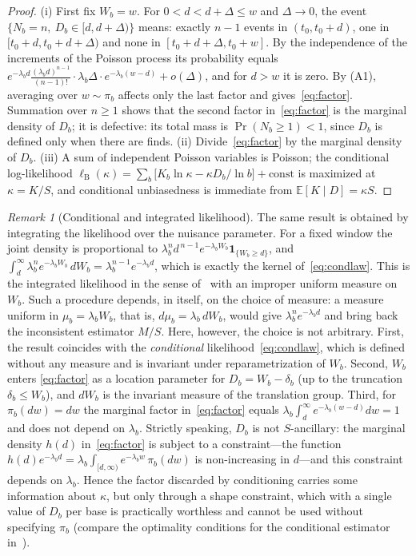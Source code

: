 \documentclass[11pt,a4paper]{article}
\theoremstyle{plain}
\theoremstyle{remark}
\newtheorem{remark}{Remark}
\begin{document}
\begin{proof}
(i) First fix $W_b=w$. For $0<d<d+\Delta\le w$ and $\Delta\to0$, the event
$\{N_b=n,\ D_b\in[d,d+\Delta)\}$ means: exactly $n-1$ events in $(t_0,t_0+d)$,
one in $[t_0+d,t_0+d+\Delta)$ and none in $[t_0+d+\Delta,t_0+w]$. By the
independence of the increments of the Poisson process its probability equals
$e^{-\lambda_bd}\frac{(\lambda_bd)^{n-1}}{(n-1)!}\cdot\lambda_b\Delta\cdot
e^{-\lambda_b(w-d)}+o(\Delta)$, and for $d>w$ it is zero. By (A1), averaging
over $w\sim\pi_b$ affects only the last factor and gives~\eqref{eq:factor}.
Summation over $n\ge1$ shows that the second factor in~\eqref{eq:factor} is the
marginal density of $D_b$; it is defective: its total mass is $\Pr(N_b\ge1)<1$,
since $D_b$ is defined only when there are finds.
(ii) Divide~\eqref{eq:factor} by the marginal density of $D_b$.
(iii) A sum of independent Poisson variables is Poisson; the conditional
log-likelihood $\ell_{\mathrm B}(\kappa)=\sum_b\bigl[K_b\ln\kappa-\kappa D_b/\ln b\bigr]
+\mathrm{const}$ is maximized at $\kappa=K/S$, and conditional unbiasedness is
immediate from $\mathbb E[K\mid D]=\kappa S$.
\end{proof}

\begin{remark}[Conditional and integrated likelihood]\label{rem:integrated}
The same result is obtained by integrating the likelihood over the nuisance
parameter. For a fixed window the joint density is proportional to
$\lambda_b^{n}d^{\,n-1}e^{-\lambda_bW_b}\mathbf 1_{\{W_b\ge d\}}$, and
$\int_d^\infty\lambda_b^{n}e^{-\lambda_bW_b}\,dW_b=\lambda_b^{n-1}e^{-\lambda_bd}$,
which is exactly the kernel of~\eqref{eq:condlaw}. This is the integrated
likelihood in the sense of~\cite{berger1999} with an improper uniform measure on
$W_b$. Such a procedure depends, in itself, on the choice of measure: a measure
uniform in $\mu_b=\lambda_bW_b$, that is, $d\mu_b=\lambda_b\,dW_b$, would give
$\lambda_b^{n}e^{-\lambda_bd}$ and bring back the inconsistent estimator $M/S$.
Here, however, the choice is not arbitrary. First, the result coincides with the
\emph{conditional} likelihood~\eqref{eq:condlaw}, which is defined without any
measure and is invariant under reparametrization of $W_b$. Second, $W_b$ enters
\eqref{eq:factor} as a location parameter for $D_b=W_b-\delta_b$ (up to the
truncation $\delta_b\le W_b$), and $dW_b$ is the invariant measure of the
translation group. Third, for $\pi_b(dw)=dw$ the
marginal factor in~\eqref{eq:factor} equals
$\lambda_b\int_d^\infty e^{-\lambda_b(w-d)}dw=1$ and does not depend on
$\lambda_b$. Strictly speaking, $D_b$ is not $S$-ancillary: the marginal
density $h(d)$ in~\eqref{eq:factor} is subject to a constraint---the function
$h(d)e^{-\lambda_bd}=\lambda_b\int_{[d,\infty)}e^{-\lambda_bw}\,\pi_b(dw)$ is
non-increasing in $d$---and this constraint depends on $\lambda_b$. Hence the
factor discarded by conditioning carries some information about $\kappa$, but
only through a shape constraint, which with a single value of $D_b$ per base is
practically worthless and cannot be used without specifying $\pi_b$ (compare the
optimality conditions for the conditional estimator in~\cite{lindsay1980}).
\end{remark}
\end{document}
